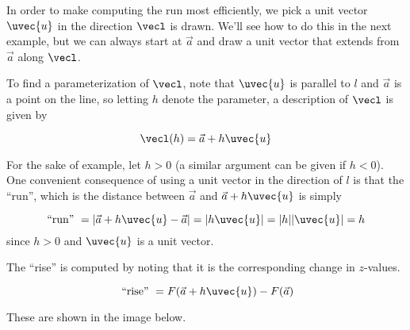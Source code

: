 \documentclass{ximera}
\begin{document}
In order to make computing the run most efficiently, we pick a unit
vector $\uvec{u}$ in the direction $\vecl$ is drawn.  We'll see how to
do this in the next example, but we can always start at $\vec{a}$ and
draw a unit vector that extends from $\vec{a}$ along $\vecl$.

To find a parameterization of $\vecl$, note that $\uvec{u}$ is parallel to
$l$ and $\vec{a}$ is a point on the line, so letting $h$ denote the
parameter, a description of $\vecl$ is given by

\[
\vecl(h) = \vec{a} + h \uvec{u} 
\]

For the sake of example, let $h>0$ (a similar argument can be given if
$h<0$).  One convenient consequence of using a unit vector in the
direction of $l$ is that the ``run'', which is the distance between
$\vec{a}$ and $\vec{a}+h\uvec{u}$ is simply

\[
\textrm{``run'' } = \left|\vec{a}+h\uvec{u} - \vec{a}\right| = |h \uvec{u}| = |h| |\uvec{u}| = h
\]
since $h>0$ and $\uvec{u}$ is a unit vector.

The ``rise'' is computed by noting that it is the corresponding change in $z$-values.

\[
\textrm{ ``rise'' } = F(\vec{a}+h\uvec{u})-F(\vec{a})
\] 

These are shown in the image below.
\end{document}
